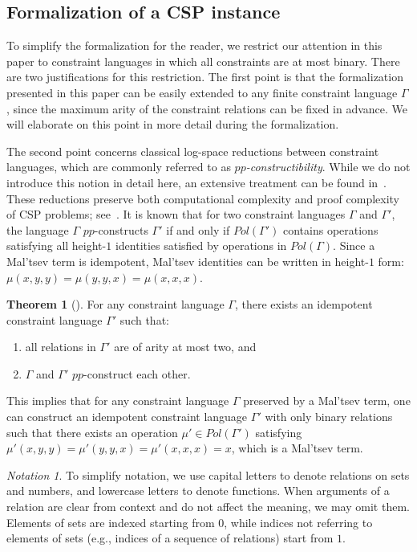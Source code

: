 \documentclass{article}
\theoremstyle{definition}
\theoremstyle{theorem}
\newtheorem{thm}{Theorem}
\theoremstyle{theorem}
\theoremstyle{remark}
\theoremstyle{remark}
\theoremstyle{example}
\theoremstyle{notation}
\newtheorem{notation}{Notation}
\theoremstyle{theorem}
\begin{document}
\subsection{Formalization of a CSP instance}\label{alskdj;lkys}

To simplify the formalization for the reader, we restrict our attention in this paper to constraint languages in which all constraints are at most binary. There are two justifications for this restriction. The first point is that the formalization presented in this paper can be easily extended to any finite constraint language $\Gamma$, since the maximum arity of the constraint relations can be fixed in advance. We will elaborate on this point in more detail during the formalization. 

The second point concerns classical log-space reductions between constraint languages, which are commonly referred to as \emph{$pp$-constructibility}. While we do not introduce this notion in detail here, an extensive treatment can be found in~\cite{barto_et_al}. These reductions preserve both computational complexity and proof complexity of CSP problems; see~\cite{10.1145/3265985}. It is known that for two constraint languages $\Gamma$ and $\Gamma'$, the language $\Gamma$ $pp$-constructs $\Gamma'$ if and only if $Pol(\Gamma')$ contains operations satisfying all height-$1$ identities satisfied by operations in $Pol(\Gamma)$. Since a Mal'tsev term is idempotent, Mal'tsev identities can be written in height-$1$ form: $\mu(x,y,y) = \mu(y,y,x) = \mu(x,x,x)$. 
\begin{thm}[\cite{barto_et_al}]
    For any constraint language $\Gamma$, there exists an idempotent constraint language $\Gamma'$ such that:
    \begin{enumerate}
        \item all relations in $\Gamma'$ are of arity at most two, and
        \item $\Gamma$ and $\Gamma'$ $pp$-construct each other.
    \end{enumerate}
\end{thm}
This implies that for any constraint language $\Gamma$ preserved by a Mal'tsev term, one can construct an idempotent constraint language $\Gamma'$ with only binary relations such that there exists an operation $\mu'\in Pol(\Gamma')$ satisfying $\mu'(x,y,y) = \mu'(y,y,x) = \mu'(x,x,x) = x$, which is a Mal'tsev term.

\begin{notation}
To simplify notation, we use capital letters to denote relations on sets and numbers, and lowercase letters to denote functions. When arguments of a relation are clear from context and do not affect the meaning, we may omit them. Elements of sets are indexed starting from $0$, while indices not referring to elements of sets (e.g., indices of a sequence of relations) start from $1$.
\end{notation}
\end{document}
